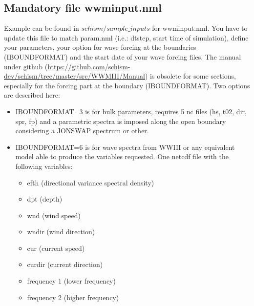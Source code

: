 \documentclass[preprints,briefreport,accept,oneauthor,pdftex]{Definitions/mdpi}
\begin{document}
\subsection{Mandatory file wwminput.nml}
\noindent Example can be found in $schism/sample\_inputs$ for wwminput.nml. You have to update this file to match param.nml (i.e.: dtstep, start time of simulation), define your parameters, your option for wave forcing at the boundaries (IBOUNDFORMAT) and the start date of your wave forcing files. The manual under github (\url{https://github.com/schism-dev/schism/tree/master/src/WWMIII/Manual}) is obsolete for some sections, especially for the forcing part at the boundary (IBOUNDFORMAT). Two options are described here:
\begin{itemize}
    \item IBOUNDFORMAT=3 is for bulk parameters, requires 5 nc files (hs, t02, dir, spr, fp) and a parametric spectra is imposed along the open boundary considering a  JONSWAP spectrum or other.
    \item IBOUNDFORMAT=6 is for wave spectra from WWIII or any equivalent model able to produce the variables requested. One netcdf file with the following variables: 
    \begin{itemize}
    \item efth (directional variance spectral density) 
    \item dpt (depth)
    \item wnd (wind speed)
     \item wndir (wind direction)
     \item cur (current speed)
     \item curdir (current direction)
     \item frequency 1 (lower frequency)
     \item frequency 2 (higher frequency)
     \end{itemize}
\end{itemize}
\end{document}
